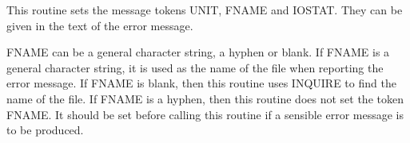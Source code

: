 \documentclass[twoside,11pt,nolof]{starlink}
\begin{document}
\begin{small}
{{{         \sstitem
         This routine sets the message tokens UNIT, FNAME and IOSTAT.
            They can be given in the text of the error message.

         \sstitem
         FNAME can be a general character string, a hyphen or blank.
            If FNAME is a general character string, it is used as the name
            of the file when reporting the error message.
            If FNAME is blank, then this routine uses INQUIRE to find the
            name of the file.
            If FNAME is a hyphen, then this routine does not set the token
            FNAME. It should be set before calling this routine if a
            sensible error message is to be produced.
      }
   }
}
\end{small}
\end{document}
